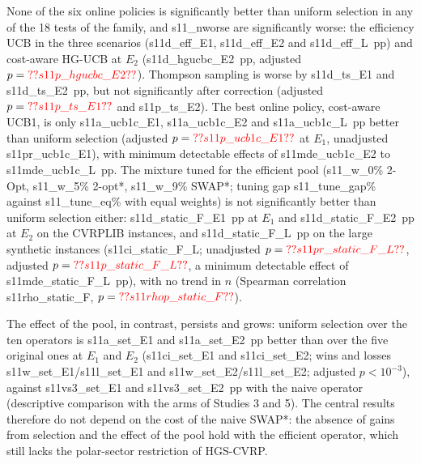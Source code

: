 None of the six online policies is significantly better than uniform selection in any of the 18 tests of the family, and \num{s11_nworse} are significantly worse: the efficiency UCB in the three scenarios (\num{s11d_eff_E1}, \num{s11d_eff_E2} and \num{s11d_eff_L}~pp) and cost-aware HG-UCB at $E_2$ (\num{s11d_hgucbc_E2}~pp, adjusted $p=\num{s11p_hgucbc_E2}$). Thompson sampling is worse by \num{s11d_ts_E1} and \num{s11d_ts_E2}~pp, but not significantly after correction (adjusted $p=\num{s11p_ts_E1}$ and \num{s11p_ts_E2}). The best online policy, cost-aware UCB1, is only \num{s11a_ucb1c_E1}, \num{s11a_ucb1c_E2} and \num{s11a_ucb1c_L}~pp better than uniform selection (adjusted $p=\num{s11p_ucb1c_E1}$ at $E_1$, unadjusted \num{s11pr_ucb1c_E1}), with minimum detectable effects of \num{s11mde_ucb1c_E2} to \num{s11mde_ucb1c_L}~pp. The mixture tuned for the efficient pool (\num{s11_w_0}\% 2-Opt, \num{s11_w_5}\% 2-opt*, \num{s11_w_9}\% SWAP*; tuning gap \num{s11_tune_gap}\% against \num{s11_tune_eq}\% with equal weights) is not significantly better than uniform selection either: \num{s11d_static_F_E1}~pp at $E_1$ and \num{s11d_static_F_E2}~pp at $E_2$ on the CVRPLIB instances, and \num{s11d_static_F_L}~pp on the large synthetic instances (\num{s11ci_static_F_L}; unadjusted $p=\num{s11pr_static_F_L}$, adjusted $p=\num{s11p_static_F_L}$, a minimum detectable effect of \num{s11mde_static_F_L}~pp), with no trend in $n$ (Spearman correlation \num{s11rho_static_F}, $p=\num{s11rhop_static_F}$).



The effect of the pool, in contrast, persists and grows: uniform selection over the ten operators is \num{s11a_set_E1} and \num{s11a_set_E2}~pp better than over the five original ones at $E_1$ and $E_2$ (\num{s11ci_set_E1} and \num{s11ci_set_E2}; wins and losses \num{s11w_set_E1}/\num{s11l_set_E1} and \num{s11w_set_E2}/\num{s11l_set_E2}; adjusted $p<10^{-3}$), against \num{s11vs3_set_E1} and \num{s11vs3_set_E2}~pp with the naive operator (descriptive comparison with the arms of Studies 3 and 5). The central results therefore do not depend on the cost of the naive SWAP*: the absence of gains from selection and the effect of the pool hold with the efficient operator, which still lacks the polar-sector restriction of HGS-CVRP.


